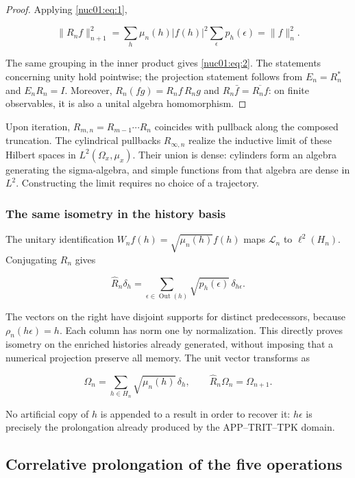 \begin{proof}
Applying \eqref{nuc01:eq:1},

\[
\|R_nf\|_{n+1}^2
=\sum_h\mu_n(h)|f(h)|^2\sum_\epsilon p_h(\epsilon)
=\|f\|_n^2.
\]

The same grouping in the inner product gives \eqref{nuc01:eq:2}. The statements concerning unity hold pointwise; the projection statement follows from \(E_n=R_n^*\) and \(E_nR_n=I\). Moreover, \(R_n(fg)=R_nf\,R_ng\) and \(R_n\bar f=\overline{R_nf}\): on finite observables, it is also a unital algebra homomorphism.
\end{proof}

Upon iteration, \(R_{m,n}=R_{m-1}\cdots R_n\) coincides with pullback along the composed truncation. The cylindrical pullbacks \(R_{\infty,n}\) realize the inductive limit of these Hilbert spaces in \(L^2(\Omega_x,\mu_x)\). Their union is dense: cylinders form an algebra generating the sigma-algebra, and simple functions from that algebra are dense in \(L^2\). Constructing the limit requires no choice of a trajectory.

\subsubsection{The same isometry in the history basis}

The unitary identification \(W_nf(h)=\sqrt{\mu_n(h)}f(h)\) maps \(\mathscr L_n\) to \(\ell^2(H_n)\). Conjugating \(R_n\) gives

\begin{equation}
\widehat R_n\delta_h
=\sum_{\epsilon\in\operatorname{Out}(h)}\sqrt{p_h(\epsilon)}\,\delta_{h\epsilon}.
\label{nuc01:eq:3}
\end{equation}

The vectors on the right have disjoint supports for distinct predecessors, because \(\rho_n(h\epsilon)=h\). Each column has norm one by normalization. This directly proves isometry on the enriched histories already generated, without imposing that a numerical projection preserve all memory. The unit vector transforms as

\[
\Omega_n=\sum_{h\in H_n}\sqrt{\mu_n(h)}\,\delta_h,
\qquad \widehat R_n\Omega_n=\Omega_{n+1}.
\]

No artificial copy of \(h\) is appended to a result in order to recover it: \(h\epsilon\) is precisely the prolongation already produced by the APP–TRIT–TPK domain.

\subsection{Correlative prolongation of the five operations}

